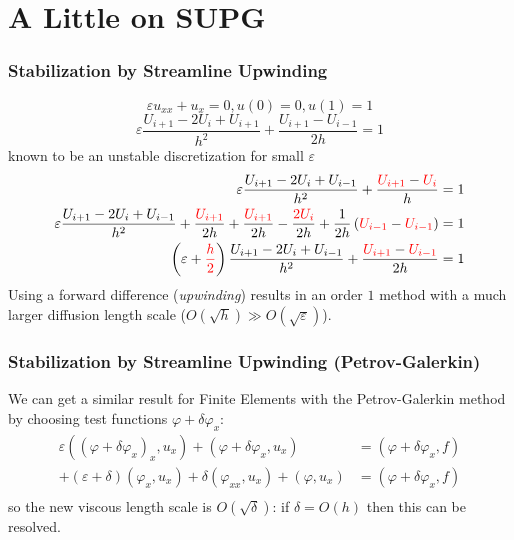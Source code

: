 \documentclass[8pt]{beamer}
\begin{document}
\section{A Little on SUPG}
    \begin{frame}
        \frametitle{Stabilization by Streamline Upwinding}
        \begin{equation}
            \varepsilon u_{xx} +
            u_x = 0,
            u(0) = 0, u(1) = 1
        \end{equation}
        \pause
        \begin{equation}
            \varepsilon \dfrac{U_{i + 1} - 2 U_i + U_{i + 1}}{h^2} +
            \dfrac{U_{i + 1} - U_{i - 1}}{2 h} = 1
        \end{equation}
        known to be an unstable discretization for small \(\varepsilon\)
        \pause
        \begin{align}
            \varepsilon
            \dfrac{U_{i + 1} - 2 U_i + U_{i - 1}}{h^2} +
            \dfrac{{\color{red} U_{i + 1}} - {\color{red} U_i}}{h} &= 1       \\
            \varepsilon
            \dfrac{U_{i + 1} - 2 U_i + U_{i - 1}}{h^2} +
            \dfrac{{\color{red} U_{i + 1}}}{2 h} +
            \dfrac{{\color{red} U_{i + 1}}}{2 h} -
            \dfrac{{\color{red} 2 U_i}}{2 h} +
            \dfrac{1}{2 h}
            \left(
            {{\color{red} U_{i - 1}} - {\color{red} U_{i - 1}}}
            \right)
            &= 1                                                              \\
            \left(\varepsilon + {\color{red} \dfrac{h}{2}}\right)
            \dfrac{U_{i + 1} - 2 U_i + U_{i - 1}}{h^2} +
            \dfrac{{\color{red} U_{i + 1}} - {\color{red} U_{i - 1}}}{2 h} &= 1
        \end{align}
        \pause
        Using a forward difference (\emph{upwinding}) results in an order \(1\)
        method with a much larger diffusion length scale (\(O(\sqrt{h}) \gg
        O(\sqrt{\varepsilon})\)).
    \end{frame}

    \begin{frame}
        \frametitle{Stabilization by Streamline Upwinding (Petrov-Galerkin)}
        We can get a similar result for Finite Elements with the Petrov-Galerkin
        method by choosing test functions \(\varphi + \delta \varphi_x\):
        \begin{align}
            \varepsilon ((\varphi + \delta \varphi_x)_x, u_x)
            + (\varphi + \delta \varphi_x, u_x)
            &= (\varphi + \delta \varphi_x, f)                                \\
            + (\varepsilon + \delta) (\varphi_x, u_x)
            + \delta (\varphi_{xx}, u_x)
            + (\varphi, u_x)
            &= (\varphi + \delta \varphi_x, f)                                \\
        \end{align}
        so the new viscous length scale is \(O(\sqrt{\delta})\): if \(\delta =
        O(h)\) then this can be resolved.
    \end{frame}
\end{document}
